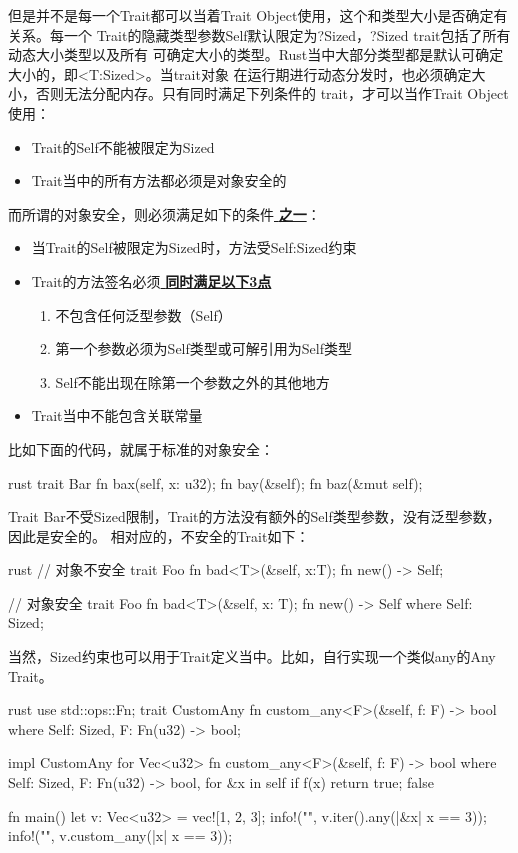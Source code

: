 但是并不是每一个Trait都可以当着Trait Object使用，这个和类型大小是否确定有关系。每一个
Trait的隐藏类型参数Self默认限定为?Sized，?Sized trait包括了所有动态大小类型以及所有
可确定大小的类型。Rust当中大部分类型都是默认可确定大小的，即<T:Sized>。当trait对象
在运行期进行动态分发时，也必须确定大小，否则无法分配内存。只有同时满足下列条件的
trait，才可以当作Trait Object使用：
\begin{itemize}
  \item Trait的Self不能被限定为Sized
  \item Trait当中的所有方法都必须是对象安全的
\end{itemize}

而所谓的对象安全，则必须满足如下的条件\underline{\color{red} \textbf{之一}}：
\begin{itemize}
  \item 当Trait的Self被限定为Sized时，方法受Self:Sized约束
  \item Trait的方法签名必须\underline{\color{red} \textbf{同时满足以下3点}}
  \begin{enumerate}
    \item 不包含任何泛型参数（Self）
    \item 第一个参数必须为Self类型或可解引用为Self类型
    \item Self不能出现在除第一个参数之外的其他地方
  \end{enumerate}
  \item Trait当中不能包含关联常量
\end{itemize}

比如下面的代码，就属于标准的对象安全：
\begin{code-block}{rust}
trait Bar {
    fn bax(self, x: u32);
    fn bay(&self);
    fn baz(&mut self);
}
\end{code-block}
Trait Bar不受Sized限制，Trait的方法没有额外的Self类型参数，没有泛型参数，因此是安全的。
相对应的，不安全的Trait如下：
\begin{code-block}{rust}
// 对象不安全
trait Foo {
    fn bad<T>(&self, x:T);
    fn new() -> Self;
}

// 对象安全
trait Foo {
    fn bad<T>(&self, x: T);
    fn new() -> Self
    where
        Self: Sized;
}
\end{code-block}

当然，Sized约束也可以用于Trait定义当中。比如，自行实现一个类似any的Any Trait。
\begin{code-block}{rust}
use std::ops::Fn;
trait CustomAny {
    fn custom_any<F>(&self, f: F) -> bool
    where
        Self: Sized,
        F: Fn(u32) -> bool;
}

impl CustomAny for Vec<u32> {
    fn custom_any<F>(&self, f: F) -> bool
    where
        Self: Sized,
        F: Fn(u32) -> bool,
    {
        for &x in self {
            if f(x) {
                return true;
            }
        }
        false
    }
}

fn main() {
    let v: Vec<u32> = vec![1, 2, 3];
    info!("{}", v.iter().any(|&x| x == 3));
    info!("{}", v.custom_any(|x| x == 3));
}
\end{code-block}

